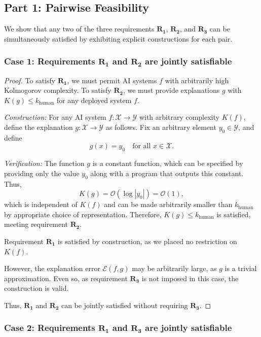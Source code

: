 \documentclass[11pt,letter,leqno]{article}
\begin{document}
\subsection*{Part 1: Pairwise Feasibility}

We show that any two of the three requirements $\mathbf{R_1}$, $\mathbf{R_2}$, and 
$\mathbf{R_3}$ can be simultaneously satisfied by exhibiting explicit constructions 
for each pair.

\subsubsection*{Case 1: Requirements $\mathbf{R_1}$ and $\mathbf{R_2}$ are jointly satisfiable}

\begin{proof}
To satisfy $\mathbf{R_1}$, we must permit AI systems $f$ with arbitrarily high 
Kolmogorov complexity.  To satisfy $\mathbf{R_2}$, we must provide explanations 
$g$ with $K(g) \leq k_{\text{human}}$ for any deployed system $f$.

\textit{Construction:} For any AI system $f: \mathcal{X} \to \mathcal{Y}$ with 
arbitrary complexity $K(f)$, define the explanation $g: \mathcal{X} \to \mathcal{Y}$ 
as follows. Fix an arbitrary element $y_0 \in \mathcal{Y}$, and define
\[
g(x) = y_0 \quad \text{for all } x \in \mathcal{X}.
\]

\textit{Verification:} The function $g$ is a constant function, which can be 
specified by providing only the value $y_0$ along with a program that outputs 
this constant. Thus,
\[
K(g) = \mathcal{O}(\log |y_0|) = \mathcal{O}(1),
\]
which is independent of $K(f)$ and can be made arbitrarily smaller than 
$k_{\text{human}}$ by appropriate choice of representation. Therefore, 
$K(g) \leq k_{\text{human}}$ is satisfied, meeting requirement $\mathbf{R_2}$.

Requirement $\mathbf{R_1}$ is satisfied by construction, as we placed no restriction 
on $K(f)$.

However, the explanation error $\mathcal{E}(f,g)$ may be arbitrarily large, as 
$g$ is a trivial approximation.  Even so, as requirement $\mathbf{R_3}$ is not imposed in 
this case, the construction is valid.

Thus, $\mathbf{R_1}$ and $\mathbf{R_2}$ can be jointly satisfied without requiring 
$\mathbf{R_3}$.
\end{proof}

\subsubsection*{Case 2: Requirements $\mathbf{R_1}$ and $\mathbf{R_3}$ are jointly satisfiable}
\end{document}
